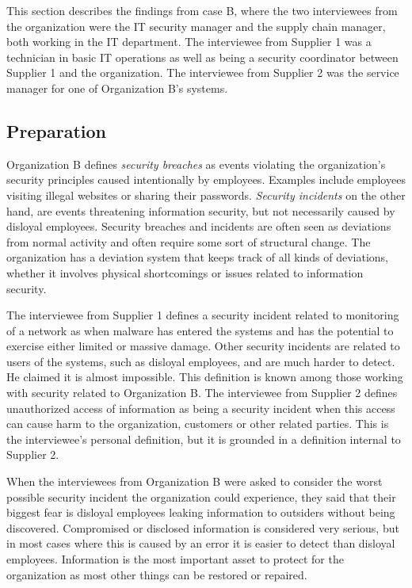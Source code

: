This section describes the findings from case B, where the two interviewees from the organization were the IT security manager and the supply chain manager, both working in the IT department. The interviewee from Supplier 1 was a technician in basic IT operations as well as being a security coordinator between Supplier 1 and the organization. The interviewee from Supplier 2 was the service manager for one of Organization B's systems.

\subsection{Preparation}
Organization B defines \textit{security breaches} as events violating the organization's security principles caused intentionally by employees. Examples include employees visiting illegal websites or sharing their passwords. \textit{Security incidents} on the other hand, are events threatening information security, but not necessarily caused by disloyal employees. Security breaches and incidents are often seen as deviations from normal activity and often require some sort of structural change. The organization has a deviation system that keeps track of all kinds of deviations, whether it involves physical shortcomings or issues related to information security.

The interviewee from Supplier 1 defines a security incident related to monitoring of a network as when malware has entered the systems and has the potential to exercise either limited or massive damage. Other security incidents are related to users of the systems, such as disloyal employees, and are much harder to detect. He claimed it is almost impossible. This definition is known among those working with security related to Organization B. The interviewee from Supplier 2 defines unauthorized access of information as being a security incident when this access can cause harm to the organization, customers or other related parties. This is the interviewee's personal definition, but it is grounded in a definition internal to Supplier 2.

When the interviewees from Organization B were asked to consider the worst possible security incident the organization could experience, they said that their biggest fear is disloyal employees leaking information to outsiders without being discovered. Compromised or disclosed information is considered very serious, but in most cases where this is caused by an error it is easier to detect than disloyal employees. Information is the most important asset to protect for the organization as most other things can be restored or repaired.

